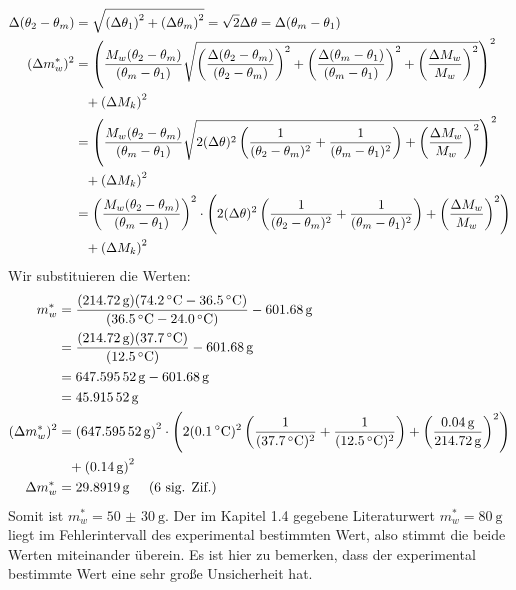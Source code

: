 	  	\begin{align}
	  		\Delta (\theta_2 - \theta_m) &= \addquad{\theta_1, \theta_m} = \sqrt{2} \Delta\theta = \Delta (\theta_m - \theta_1)\\\
	  		(\Delta m_w^*)^2 &=  \left(\frac{M_w(\theta_2 - \theta_m)}{(\theta_m - \theta_1)} 
	  		\relquad{(\theta_2 - \theta_m), (\theta_m - \theta_1), M_w}\right)^2 \notag \\
	  		&\phantom{=}+ \left(\Delta M_k\right)^2 \\
	  		&= \left(\frac{M_w(\theta_2 - \theta_m)}{(\theta_m - \theta_1)}\sqrt{2(\Delta\theta)^2\left(\frac{1}{(\theta_2 - \theta_m)^2} + \frac{1}{(\theta_m - \theta_1)^2}\right) + \left(\frac{\Delta M_w}{M_w}\right)^2}\right)^2 \notag \\
	  		&\phantom{=}+ \left(\Delta M_k\right)^2 \\
	  		&= \left(\frac{M_w(\theta_2 - \theta_m)}{(\theta_m - \theta_1)}\right)^2\cdot\left({2(\Delta\theta)^2\left(\frac{1}{(\theta_2 - \theta_m)^2} + \frac{1}{(\theta_m - \theta_1)^2}\right) + \left(\frac{\Delta M_w}{M_w}\right)^2}\right) \notag \\
	  		&\phantom{=}+ \left(\Delta M_k\right)^2 
	  	\end{align}
	  	Wir substituieren die Werten:
	  	\begin{align*}
	  		m_w^* &= \frac{(\SI{214.72}{\gram})(\SI{74.2}{\celsius} - \SI{36.5}{\celsius})}{(\SI{36.5}{\celsius} - \SI{24.0}{\celsius})} - \SI{601.68}{\gram} \\
	  		&= \frac{(\SI{214.72}{\gram})(\SI{37.7}{\celsius})}{(\SI{12.5}{\celsius})} - \SI{601.68}{\gram}\\
	  		&= \SI{647.59552}{\gram} - \SI{601.68}{\gram}\\
	  		&= \SI{45.91552}{\gram}\\
	  		(\Delta m_w^*)^2 &= \left(\SI{647.59552}{\gram}\right)^2\cdot\left({2(\SI{0.1}{\celsius})^2\left(\frac{1}{(\SI{37.7}{\celsius})^2} + \frac{1}{(\SI{12.5}{\celsius})^2}\right) + \left(\frac{\SI{0.04}{\gram}}{\SI{214.72}{\gram}}\right)^2}\right) \notag \\
	  		&\phantom{=}+ \left(\SI{0.14}{\gram}\right)^2  \\
	  		\Delta m_w^* &= \SI{29.8919}{\gram} \hspace{0.5cm}\text{(6 sig. Zif.)}
	  	\end{align*}
	  	Somit ist $m_w^* = \SI{50(30)}{\gram}$. Der im Kapitel 1.4 gegebene Literaturwert $m_w^* = \SI{80}{\gram}$ liegt im Fehlerintervall des experimental bestimmten Wert, also stimmt die beide Werten miteinander überein. Es ist hier zu bemerken, dass der experimental bestimmte Wert eine sehr große Unsicherheit hat. 

